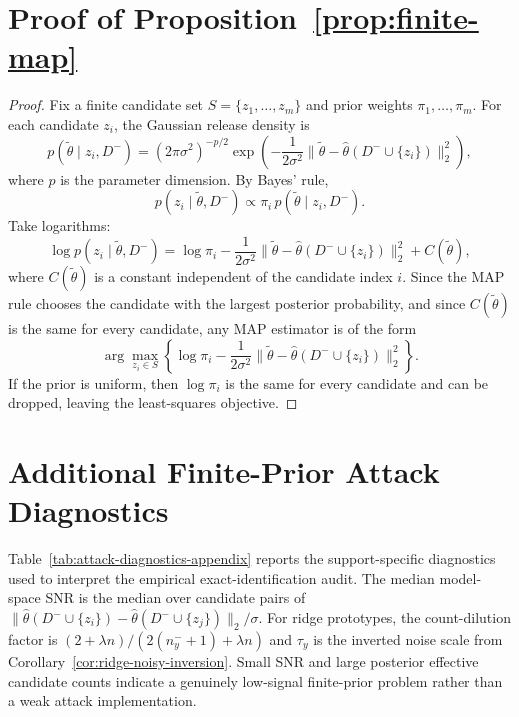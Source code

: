 \documentclass[11pt,a4paper]{report}
\theoremstyle{plain}
\theoremstyle{definition}
\theoremstyle{remark}
\begin{document}
\section{Proof of Proposition~\ref{prop:finite-map}}
\label{app:proof-finite-map}

\begin{proof}
Fix a finite candidate set $S=\{z_1,\dots,z_m\}$ and prior weights $\pi_1,\dots,\pi_m$. For each candidate $z_i$, the Gaussian release density is
\[
p(\widetilde\theta\mid z_i,D^-)
=
(2\pi\sigma^2)^{-p/2}
\exp\!\left(
-\frac{1}{2\sigma^2}\bigl\|\widetilde\theta-\widehat\theta(D^-\cup\{z_i\})\bigr\|_2^2
\right),
\]
where $p$ is the parameter dimension. By Bayes' rule,
\[
p(z_i\mid \widetilde\theta,D^-)
\propto
\pi_i\,p(\widetilde\theta\mid z_i,D^-).
\]
Take logarithms:
\[
\log p(z_i\mid \widetilde\theta,D^-)
=
\log \pi_i
-
\frac{1}{2\sigma^2}\bigl\|\widetilde\theta-\widehat\theta(D^-\cup\{z_i\})\bigr\|_2^2
+
C(\widetilde\theta),
\]
where $C(\widetilde\theta)$ is a constant independent of the candidate index $i$. Since the MAP rule chooses the candidate with the largest posterior probability, and since $C(\widetilde\theta)$ is the same for every candidate, any MAP estimator is of the form
\[
\arg\max_{z_i\in S}
\left\{
\log \pi_i
-
\frac{1}{2\sigma^2}\bigl\|\widetilde\theta-\widehat\theta(D^-\cup\{z_i\})\bigr\|_2^2
\right\}.
\]
If the prior is uniform, then $\log \pi_i$ is the same for every candidate and can be dropped, leaving the least-squares objective.
\end{proof}


\section{Additional Finite-Prior Attack Diagnostics}
\label{app:attack-diagnostics}

Table~\ref{tab:attack-diagnostics-appendix} reports the support-specific diagnostics used to interpret the empirical exact-identification audit. The median model-space SNR is the median over candidate pairs of $\|\hat\theta(D^-\cup\{z_i\})-\hat\theta(D^-\cup\{z_j\})\|_2/\sigma$. For ridge prototypes, the count-dilution factor is $(2+\lambda n)/(2(n_y^-+1)+\lambda n)$ and $\tau_y$ is the inverted noise scale from Corollary~\ref{cor:ridge-noisy-inversion}. Small SNR and large posterior effective candidate counts indicate a genuinely low-signal finite-prior problem rather than a weak attack implementation.
\end{document}

